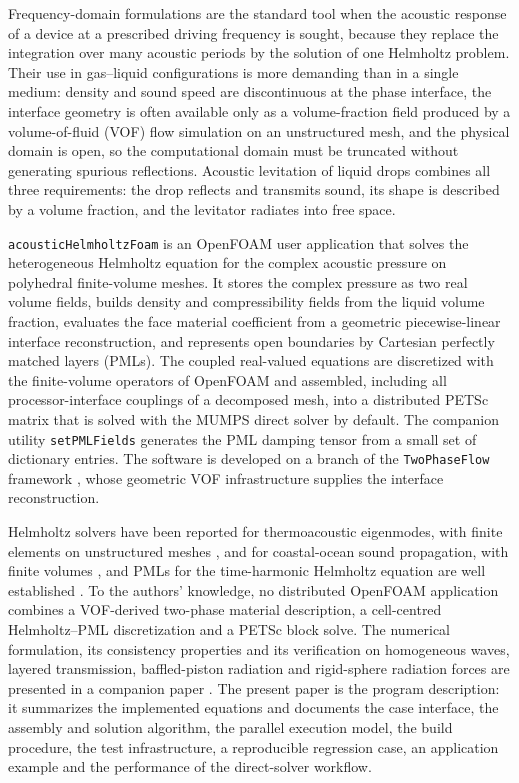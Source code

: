 \documentclass[final,12pt,nopreprintline]{elsarticle}
\newcommand{\code}[1]{\texttt{#1}}
\begin{document}
Frequency-domain formulations are the standard tool when the acoustic response
of a device at a prescribed driving frequency is sought, because they replace
the integration over many acoustic periods by the solution of one Helmholtz
problem.  Their use in gas--liquid configurations is more demanding than in a
single medium: density and sound speed are discontinuous at the phase
interface, the interface geometry is often available only as a volume-fraction
field produced by a volume-of-fluid (VOF) flow simulation on an unstructured
mesh, and the physical domain is open, so the computational domain must be
truncated without generating spurious reflections.  Acoustic levitation of
liquid drops \cite{Andrade2018review,andrade2019numerical} combines all three
requirements: the drop reflects and transmits sound, its shape is described by
a volume fraction, and the levitator radiates into free space.

\code{acousticHelmholtzFoam} is an OpenFOAM \cite{Weller1998} user application
that solves the heterogeneous Helmholtz equation for the complex acoustic
pressure on polyhedral finite-volume meshes.  It stores the complex pressure as
two real volume fields, builds density and compressibility fields from the
liquid volume fraction, evaluates the face material coefficient from a
geometric piecewise-linear interface reconstruction, and represents open
boundaries by Cartesian perfectly matched layers (PMLs).  The coupled
real-valued equations are discretized with the finite-volume operators of
OpenFOAM and assembled, including all processor-interface couplings of a
decomposed mesh, into a distributed PETSc \cite{Balay1997,PETScManual} matrix
that is solved with the MUMPS \cite{Amestoy2001,Amestoy2019} direct solver by
default.  The companion utility \code{setPMLFields} generates the PML damping
tensor from a small set of dictionary entries.  The software is developed on a
branch of the \code{TwoPhaseFlow} framework
\cite{ScheuflerRoenby2023TwoPhaseFlow}, whose geometric VOF infrastructure
\cite{Roenby2016,Scheufler2019} supplies the interface reconstruction.

Helmholtz solvers have been reported for thermoacoustic eigenmodes, with finite
elements on unstructured meshes \cite{Nicoud2007}, and for coastal-ocean sound
propagation, with finite volumes \cite{Long2015}, and PMLs for the
time-harmonic Helmholtz equation are well established \cite{Harari2000,Bermudez2007,Modave2014PML}.  To
the authors' knowledge, no distributed OpenFOAM application combines a
VOF-derived two-phase material description, a cell-centred Helmholtz--PML
discretization and a PETSc block solve.  The numerical formulation, its
consistency properties and its verification on homogeneous waves, layered
transmission, baffled-piston radiation and rigid-sphere radiation forces are
presented in a companion paper \cite{Xu2026HelmholtzPML}.  The present paper is
the program description: it summarizes the implemented equations and
documents the case interface, the assembly and solution algorithm, the parallel execution model,
the build procedure, the test infrastructure, a reproducible regression case,
an application example and the performance of the direct-solver workflow.
\end{document}
